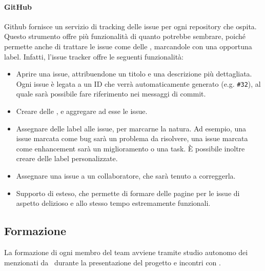     		\paragraph{GitHub}\label{Github}
			Github fornisce un servizio di tracking delle issue per ogni repository che ospita. Questo strumento offre più funzionalità di quanto potrebbe
			sembrare, poich\'e permette anche di trattare le issue come delle , marcandole con una opportuna label. Infatti, l'issue tracker offre le seguenti
			funzionalità:
			\begin{itemize}
				\item Aprire una issue, attribuendone un titolo e una descrizione più dettagliata. Ogni issue è legata a un ID che verrà automaticamente generato (e.g. \texttt{\#32}),
					al quale sarà possibile fare riferimento nei messaggi di commit.
				\item Creare delle , e aggregare ad esse le issue.
				\item Assegnare delle label alle issue, per marcarne la natura. Ad esempio, una issue marcata come bug sarà un problema da risolvere,
					una issue marcata come enhancement sarà un miglioramento o una task. È possibile inoltre creare delle label personalizzate.
				\item Assegnare una issue a un collaboratore, che sarà tenuto a correggerla.
				\item Supporto di  esteso, che permette di formare delle pagine per le issue di aspetto delizioso e allo stesso tempo estremamente funzionali.
			\end{itemize}




	\subsection{Formazione}

		La formazione di ogni membro del team avviene tramite studio autonomo dei  menzionati da \II\ durante la presentazione del progetto e incontri con \gruppo.

